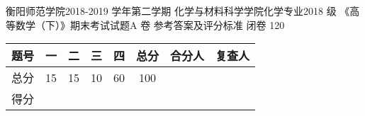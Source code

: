 \documentclass[twoside,12pt]{hnuexam}
\begin{document}
\examinformation%
{衡阳师范学院2018-2019 学年第二学期}%
{化学与材料科学学院化学专业2018 级}%
{《高等数学（下）》期末考试试题A 卷 %
	\ifprintanswers
		\newline
		参考答案及评分标准
	\fi
}%
{闭卷}%
{120}%

\vspace{-1.2em}

\fontsize{10.5pt}{1.5\baselineskip}\selectfont
\begin{table}[h]
	\centering
	\begin{tabular}{|c|c|c|c|c|c|c|c|}
		\hline
		题号 & 一 & 二 & 三 & 四 & 总分 & 合分人            & 复查人            \\
		\hline
		总分 & 15 & 15 & 10 & 60 & 100  & \multirow{2}{*}{} & \multirow{2}{*}{} \\
		\cline{1-6}
		得分 &    &    &    &    &      &                   &                   \\
		\hline
	\end{tabular}
\end{table}
\normalsize
\end{document}
